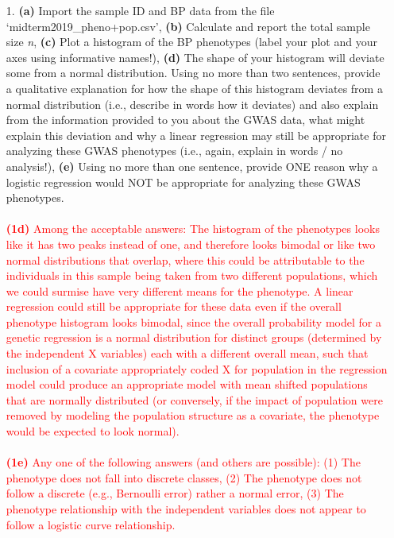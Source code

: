 \documentclass[letterpaper, 11pt]{article}
\begin{document}
\begin{itemize} 
\item[1.] \textbf{(a)} Import the sample ID and BP data from the file `midterm2019\_pheno+pop.csv', \textbf{(b)} Calculate and report the total sample size \textit{n}, \textbf{(c)} Plot a histogram of the BP phenotypes (label your plot and your axes using informative names!), \textbf{(d)} The shape of your histogram will deviate some from a normal distribution.  Using no more than two sentences, provide a qualitative explanation for how the shape of this histogram deviates from a normal distribution (i.e., describe in words how it deviates) and also explain from the information provided to you about the GWAS data, what might explain this deviation and why a linear regression may still be appropriate for analyzing these GWAS phenotypes (i.e., again, explain in words / no analysis!), \textbf{(e)} Using no more than one sentence, provide ONE reason why a logistic regression would NOT be appropriate for analyzing these GWAS phenotypes.
\\
\\
 \textcolor{red}{ 
\textbf{(1d)} Among the acceptable answers: The histogram of the phenotypes looks like it has two peaks instead of one, and therefore looks bimodal or like two normal distributions that overlap, where this could be attributable to the individuals in this sample being taken from two different populations, which we could surmise have very different means for the phenotype.  A linear regression could still be appropriate for these data even if the overall phenotype histogram looks bimodal, since the overall probability model for a genetic regression is a normal distribution for distinct groups (determined by the independent X variables) each with a different overall mean, such that inclusion of a covariate appropriately coded X for population in the regression model could produce an appropriate model with mean shifted populations that are normally distributed (or conversely, if the impact of population were removed by modeling the population structure as a covariate, the phenotype would be expected to look normal).
\\
\\
\textbf{(1e)}  Any one of the following answers (and others are possible): (1) The phenotype does not fall into discrete classes, (2) The phenotype does not follow a discrete (e.g., Bernoulli error) rather a normal error, (3) The phenotype relationship with the independent variables does not appear to follow a logistic curve relationship.} 


\end{itemize}
\end{document}
